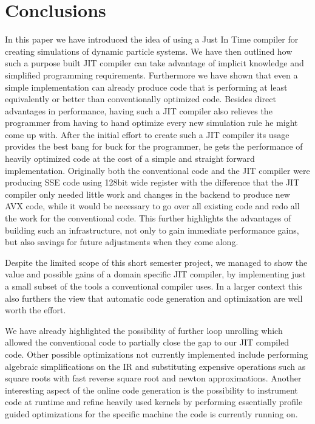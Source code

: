 \section{Conclusions}

In this paper we have introduced the idea of using a Just In Time compiler for creating simulations of dynamic particle systems. We have then outlined how such a purpose built JIT compiler can take advantage of implicit knowledge and simplified programming requirements. Furthermore we have shown that even a simple implementation can already produce code that is performing at least equivalently or better than conventionally optimized code. Besides direct advantages in performance, having such a JIT compiler also relieves the programmer from having to hand optimize every new simulation rule he might come up with. After the initial effort to create such a JIT compiler its usage provides the best bang for buck for the programmer, he gets the performance of heavily optimized code at the cost of a simple and straight forward implementation. Originally both the conventional code and the JIT compiler were producing SSE code using 128bit wide register with the difference that the JIT compiler only needed little work and changes in the backend to produce new AVX code, while it would be necessary to go over all existing code and redo all the work for the conventional code. This further highlights the advantages of building such an infrastructure, not only to gain immediate performance gains, but also savings for future adjustments when they come along.

Despite the limited scope of this short semester project, we managed to show the value and possible gains of a domain specific JIT compiler, by implementing just a small subset of the tools a conventional compiler uses. In a larger context this also furthers the view that automatic code generation and optimization are well worth the effort.

We have already highlighted the possibility of further loop unrolling which allowed the conventional code to partially close the gap to our JIT compiled code. Other possible optimizations not currently implemented include performing algebraic simplifications on the IR and substituting expensive operations such as square roots with fast reverse square root and newton approximations. Another interesting aspect of the online code generation is the possibility to instrument code at runtime and refine heavily used kernels by performing essentially profile guided optimizations for the specific machine the code is currently running on.
